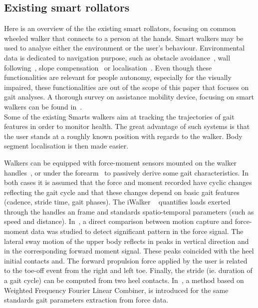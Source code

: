 \documentclass[letterpaper, 10 pt, conference]{ieeeconf}
\begin{document}
\subsection{Existing smart rollators}

Here is an overview of the the existing smart rollators, focusing on common wheeled walker that connects to a person at the hands. Smart walkers may be used to analyse either the environment or  the user's behaviour. Environmental data is dedicated to navigation purpose, such as obstacle avoidance~\cite{Spenko06}, wall following~\cite{Yu2003}, slope compensation~\cite{Hirata2007} or localisation~\cite{Kotani1996,MacNamara00}. Even though these functionalities are relevant for people autonomy, especially for the visually impaired, these functionalities are out of the scope of this paper that focuses on gait analyses. A thorough survey on assistance mobility device, focusing on smart walkers can be found in~\cite{Frizera08,Martins11}.\\

Some of the existing Smarts walkers aim at tracking the trajectories of gait features in order to monitor health. The great advantage of such systems is that the user stands at a roughly known position with regards to the walker. Body segment localisation is then made easier.

Walkers can be equipped with force-moment sensors mounted on the walker handles~\cite{Alwan07,Tung10}, or under the forearm~\cite{Frizera08,Frizera10b} to passively derive some gait characteristics. In both cases it is assumed that the force and moment recorded have cyclic changes reflecting the gait cycle and that these changes depend on basic gait features (cadence, stride time, gait phases).  The iWalker ~\cite{Tung10} quantifies loads exerted through the handles an frame and standards spatio-temporal parameters (such as speed and distance). In~\cite{Alwan07}, a direct comparison between motion capture and force-moment data was studied to detect significant pattern in the force signal. The lateral sway motion of the upper body reflects in peaks in vertical direction and in the corresponding forward moment signal. These peaks coincided with the heel initial contacts and. The forward propulsion force applied by the user is related to the toe-off event from the right and left toe. Finally, the stride (ie. duration of a gait cycle) can be computed from two heel contacts. In~\cite{Frizera10b}, a method based on Weighted Frequency Fourier Linear Combiner, is introduced for the same standards gait parameters extraction from force data.
\end{document}
